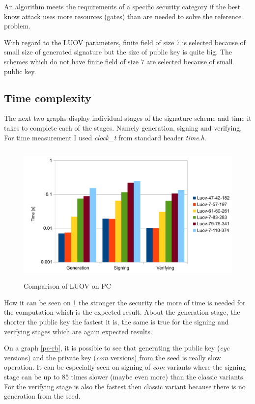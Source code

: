 \documentclass[thesis=M,english]{FITthesis}[2019/12/23]
\begin{document}
\bigskip
\noindent
An algorithm meets the requirements of a specific security category if the best know attack uses more resources (gates) than are needed to solve the reference problem.

\bigskip
\noindent
With regard to the LUOV parameters, finite field of size 7 is selected because of small size of generated signature but the size of public key is quite big. The schemes which do not have finite field of size 7 are selected because of small public key.

\subsection{Time complexity} \label{time-complex-pc}
The next two graphs display individual stages of the signature scheme and time it takes to complete each of the stages. Namely generation, signing and verifying. For time measurement I used \textit{clock\_t} from standard header \textit{time.h}. 
\begin{figure}[H]
\centering
\includegraphics[width=13cm,height=7cm]{images/pc-luov.pdf}
\caption{Comparison of LUOV on PC}
\label{pc-luov}
\end{figure}

\noindent
How it can be seen on \ref{pc-luov} the stronger the security the more of time is needed for the computation which is the expected result. About the generation stage, the shorter the public key the fastest it is, the same is true for the signing and verifying stages which are again expected results.

\bigskip
\noindent
On a graph \ref{pc-rb}, it is possible to see that generating the public key (\textit{cyc} versions) and the private key (\textit{com} versions) from the seed is really slow operation. It can be especially seen on signing of \textit{com} variants where the signing stage can be up to 85 times slower (maybe even more) than the classic variants. For the verifying stage is also the fastest then classic variant because there is no generation from the seed.
\end{document}
